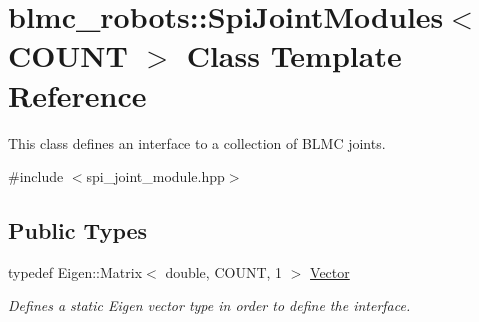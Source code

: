 \hypertarget{classblmc__robots_1_1SpiJointModules}{}\section{blmc\+\_\+robots\+:\+:Spi\+Joint\+Modules$<$ C\+O\+U\+NT $>$ Class Template Reference}
\label{classblmc__robots_1_1SpiJointModules}


This class defines an interface to a collection of B\+L\+MC joints.  




{\ttfamily \#include $<$spi\+\_\+joint\+\_\+module.\+hpp$>$}

\subsection*{Public Types}
\begin{DoxyCompactItemize}
\item 
typedef Eigen\+::\+Matrix$<$ double, C\+O\+U\+NT, 1 $>$ \hyperlink{classblmc__robots_1_1SpiJointModules_a2d48f81ec41a42a240e80cd22d4fa2f8}{Vector}\hypertarget{classblmc__robots_1_1SpiJointModules_a2d48f81ec41a42a240e80cd22d4fa2f8}{}\label{classblmc__robots_1_1SpiJointModules_a2d48f81ec41a42a240e80cd22d4fa2f8}

\begin{DoxyCompactList}\small\item\em Defines a static Eigen vector type in order to define the interface. \end{DoxyCompactList}\end{DoxyCompactItemize}
